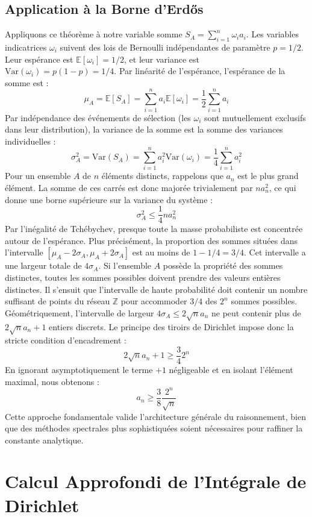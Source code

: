 \documentclass[12pt,a4paper]{article}
\begin{document}
\subsection{Application à la Borne d'Erdős}
Appliquons ce théorème à notre variable somme $S_A = \sum_{i=1}^n \omega_i a_i$. Les variables indicatrices $\omega_i$ suivent des lois de Bernoulli indépendantes de paramètre $p = 1/2$.
Leur espérance est $\mathbb{E}[\omega_i] = 1/2$, et leur variance est $\text{Var}(\omega_i) = p(1-p) = 1/4$.
Par linéarité de l'espérance, l'espérance de la somme est :
$$ \mu_A = \mathbb{E}[S_A] = \sum_{i=1}^n a_i \mathbb{E}[\omega_i] = \frac{1}{2} \sum_{i=1}^n a_i $$
Par indépendance des événements de sélection (les $\omega_i$ sont mutuellement exclusifs dans leur distribution), la variance de la somme est la somme des variances individuelles :
$$ \sigma_A^2 = \text{Var}(S_A) = \sum_{i=1}^n a_i^2 \text{Var}(\omega_i) = \frac{1}{4} \sum_{i=1}^n a_i^2 $$
Pour un ensemble $A$ de $n$ éléments distincts, rappelons que $a_n$ est le plus grand élément.
La somme de ces carrés est donc majorée trivialement par $n a_n^2$, ce qui donne une borne supérieure sur la variance du système :
$$ \sigma_A^2 \le \frac{1}{4} n a_n^2 $$
Par l'inégalité de Tchébychev, presque toute la masse probabiliste est concentrée autour de l'espérance. Plus précisément, la proportion des sommes situées dans l'intervalle $[\mu_A - 2\sigma_A, \mu_A + 2\sigma_A]$ est au moins de $1 - 1/4 = 3/4$.
Cet intervalle a une largeur totale de $4\sigma_A$. Si l'ensemble $A$ possède la propriété des sommes distinctes, toutes les sommes possibles doivent prendre des valeurs entières distinctes.
Il s'ensuit que l'intervalle de haute probabilité doit contenir un nombre suffisant de points du réseau $\mathbb{Z}$ pour accommoder $3/4$ des $2^n$ sommes possibles.
Géométriquement, l'intervalle de largeur $4\sigma_A \le 2\sqrt{n}a_n$ ne peut contenir plus de $2\sqrt{n}a_n + 1$ entiers discrets.
Le principe des tiroirs de Dirichlet impose donc la stricte condition d'encadrement :
$$ 2\sqrt{n}a_n + 1 \ge \frac{3}{4} 2^n $$
En ignorant asymptotiquement le terme $+1$ négligeable et en isolant l'élément maximal, nous obtenons :
$$ a_n \ge \frac{3}{8} \frac{2^n}{\sqrt{n}} $$
Cette approche fondamentale valide l'architecture générale du raisonnement, bien que des méthodes spectrales plus sophistiquées soient nécessaires pour raffiner la constante analytique.

\newpage
\section{Calcul Approfondi de l'Intégrale de Dirichlet}
\end{document}
